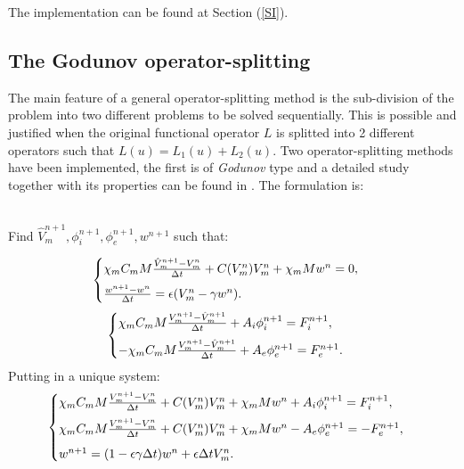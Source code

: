 \documentclass[a4paper,11pt]{article}
\begin{document}
\noindent The implementation can be found at Section (\ref{SI}).

\subsection{The Godunov operator-splitting}
The main feature of a general operator-splitting method is the sub-division of the problem into two different problems to be solved sequentially. This is possible and justified when the original functional operator $L$ is splitted into 2 different operators such that $L(u)=L_1(u)+L_2(u)$.
Two operator-splitting methods have been implemented, the first is of \emph{Godunov} type and a detailed study together with its properties can be found in \cite{spiteri}. The formulation is: \\ \\
\begin{center}Find $\hat{V}_m^{n+1},\phi_i^{n+1},\phi_e^{n+1},w^{n+1}$ such that:\end{center}
\begin{equation*}
\begin{cases}
\chi_m C_m M\frac{\hat{V}_m^{n+1} - V_m^n}{\Delta t} + C(V_m^n)V_m^n +\chi_mMw^n = 0,\vspace{2mm}\\
\frac{w^{n+1}-w^n}{\Delta t} = \epsilon (V_m^n - \gamma w^n).
\end{cases}
\end{equation*}
\vspace{3mm}
\begin{equation*}
\begin{cases}
\chi_m C_m M\frac{V_m^{n+1} - \hat{V}_m^{n+1}}{\Delta t} + A_i\phi_i^{n+1} = F_i^{n+1}, \vspace{2mm}\\
-\chi_m C_m M\frac{V_m^{n+1} - \hat{V}_m^{n+1}}{\Delta t} + A_e\phi_e^{n+1} = F_e^{n+1}.
\end{cases}
\end{equation*}
\vspace{3mm}
\noindent Putting in a unique system:
\begin{equation}\label{Godunov}
\begin{cases}
\chi_m C_m M\frac{V_m^{n+1} - V_m^n}{\Delta t} + C(V_m^n)V_m^n +\chi_mMw^n + A_i \phi_i^{n+1}= F_i^{n+1}, \vspace{2mm}\\
\chi_m C_m M\frac{V_m^{n+1} - V_m^n}{\Delta t} + C(V_m^n)V_m^n +\chi_mMw^n - A_e \phi_e^{n+1}= -F_e^{n+1}, \vspace{2mm}\\
w^{n+1} = (1-\epsilon \gamma \Delta t) w^n + \epsilon \Delta t V_m^n.
\end{cases}
\end{equation} \vspace{3mm} \\
\end{document}
